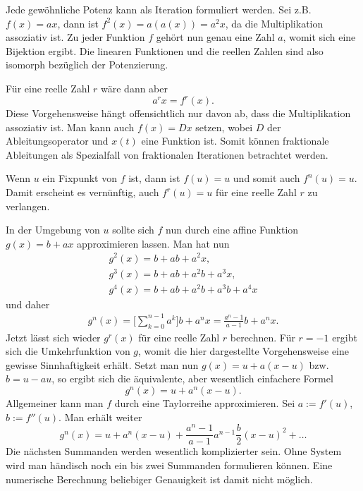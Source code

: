 \documentclass[a4paper,10pt,fleqn,twocolumn,twoside]{article}
\begin{document}
Jede gewöhnliche Potenz kann als Iteration formuliert werden.
Sei z.B. \(f(x)=ax\), dann ist \(f^2(x)=a(a(x))=a^2 x\), da die
Multiplikation assoziativ ist. Zu jeder Funktion \(f\) gehört nun
genau eine Zahl \(a\), womit sich eine Bijektion ergibt. Die
linearen Funktionen und die reellen Zahlen sind also isomorph
bezüglich der {\glqq}Potenzierung{\grqq}.

Für eine reelle Zahl \(r\) wäre dann aber
\[a^r x = f^r(x).\]
Diese Vorgehensweise hängt offensichtlich nur davon ab, dass
die Multiplikation assoziativ ist. Man kann auch \(f(x)=Dx\) setzen,
wobei \(D\) der Ableitungsoperator und \(x(t)\) eine Funktion ist.
Somit können fraktionale Ableitungen als Spezialfall von
fraktionalen Iterationen betrachtet werden.

Wenn \(u\) ein Fixpunkt von \(f\) ist, dann ist \(f(u)=u\) und
somit auch \(f^n(u)=u\). Damit erscheint es vernünftig, auch
\(f^r(u)=u\) für eine reelle Zahl \(r\) zu verlangen.

In der Umgebung von \(u\) sollte sich \(f\) nun durch eine
affine Funktion \(g(x)=b+ax\) approximieren lassen. Man hat
nun
\begin{gather*}
g^2(x) = b+ab+a^2x,\\
g^3(x) = b+ab+a^2b+a^3x,\\
g^4(x) = b+ab+a^2b+a^3b+a^4x
\end{gather*}
und daher
\begin{gather*}
g^n(x) = \bigg[\sum_{k=0}^{n-1}a^k\bigg]b+a^nx
= \frac{a^n-1}{a-1}b+a^nx.
\end{gather*}
Jetzt lässt sich wieder \(g^r(x)\) für eine reelle Zahl \(r\)
berechnen. Für \(r=-1\) ergibt sich die Umkehrfunktion von \(g\),
womit die hier dargestellte Vorgehensweise eine gewisse Sinnhaftigkeit
erhält. Setzt man nun \(g(x)=u+a(x-u)\) bzw. \(b=u-au\), so ergibt
sich die äquivalente, aber wesentlich einfachere Formel
\[g^n(x) = u+a^n(x-u).\]
Allgemeiner kann man \(f\) durch eine Taylorreihe approximieren.
Sei \(a:=f'(u)\), \(b:=f''(u)\). Man erhält weiter
\[g^n(x) = u+a^n(x-u)
+\frac{a^n-1}{a-1}a^{n-1}\frac{b}{2}(x-u)^2+\ldots\]
Die nächsten Summanden werden wesentlich komplizierter sein. Ohne
System wird man händisch noch ein bis zwei Summanden formulieren
können. Eine numerische Berechnung beliebiger Genauigkeit ist damit
nicht möglich.
\end{document}
